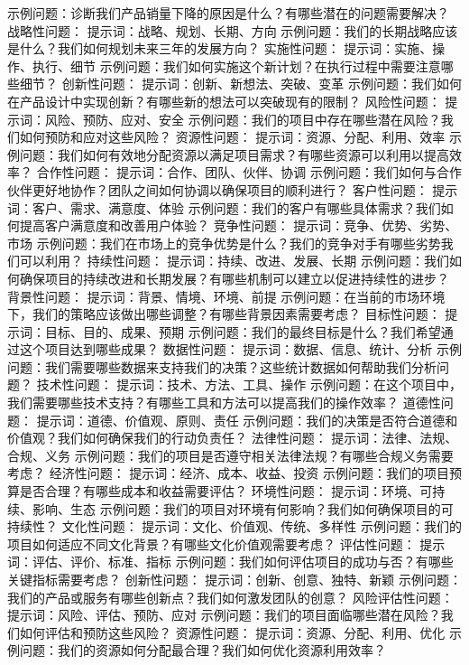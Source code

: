 \documentclass[12pt]{book}
\begin{document}
示例问题：诊断我们产品销量下降的原因是什么？有哪些潜在的问题需要解决？
战略性问题：
提示词：战略、规划、长期、方向
示例问题：我们的长期战略应该是什么？我们如何规划未来三年的发展方向？
实施性问题：
提示词：实施、操作、执行、细节
示例问题：我们如何实施这个新计划？在执行过程中需要注意哪些细节？
创新性问题：
提示词：创新、新想法、突破、变革
示例问题：我们如何在产品设计中实现创新？有哪些新的想法可以突破现有的限制？
风险性问题：
提示词：风险、预防、应对、安全
示例问题：我们的项目中存在哪些潜在风险？我们如何预防和应对这些风险？
资源性问题：
提示词：资源、分配、利用、效率
示例问题：我们如何有效地分配资源以满足项目需求？有哪些资源可以利用以提高效率？
合作性问题：
提示词：合作、团队、伙伴、协调
示例问题：我们如何与合作伙伴更好地协作？团队之间如何协调以确保项目的顺利进行？
客户性问题：
提示词：客户、需求、满意度、体验
示例问题：我们的客户有哪些具体需求？我们如何提高客户满意度和改善用户体验？
竞争性问题：
提示词：竞争、优势、劣势、市场
示例问题：我们在市场上的竞争优势是什么？我们的竞争对手有哪些劣势我们可以利用？
持续性问题：
提示词：持续、改进、发展、长期
示例问题：我们如何确保项目的持续改进和长期发展？有哪些机制可以建立以促进持续性的进步？
背景性问题：
提示词：背景、情境、环境、前提
示例问题：在当前的市场环境下，我们的策略应该做出哪些调整？有哪些背景因素需要考虑？
目标性问题：
提示词：目标、目的、成果、预期
示例问题：我们的最终目标是什么？我们希望通过这个项目达到哪些成果？
数据性问题：
提示词：数据、信息、统计、分析
示例问题：我们需要哪些数据来支持我们的决策？这些统计数据如何帮助我们分析问题？
技术性问题：
提示词：技术、方法、工具、操作
示例问题：在这个项目中，我们需要哪些技术支持？有哪些工具和方法可以提高我们的操作效率？
道德性问题：
提示词：道德、价值观、原则、责任
示例问题：我们的决策是否符合道德和价值观？我们如何确保我们的行动负责任？
法律性问题：
提示词：法律、法规、合规、义务
示例问题：我们的项目是否遵守相关法律法规？有哪些合规义务需要考虑？
经济性问题：
提示词：经济、成本、收益、投资
示例问题：我们的项目预算是否合理？有哪些成本和收益需要评估？
环境性问题：
提示词：环境、可持续、影响、生态
示例问题：我们的项目对环境有何影响？我们如何确保项目的可持续性？
文化性问题：
提示词：文化、价值观、传统、多样性
示例问题：我们的项目如何适应不同文化背景？有哪些文化价值观需要考虑？
评估性问题：
提示词：评估、评价、标准、指标
示例问题：我们如何评估项目的成功与否？有哪些关键指标需要考虑？
创新性问题：
提示词：创新、创意、独特、新颖
示例问题：我们的产品或服务有哪些创新点？我们如何激发团队的创意？
风险评估性问题：
提示词：风险、评估、预防、应对
示例问题：我们的项目面临哪些潜在风险？我们如何评估和预防这些风险？
资源性问题：
提示词：资源、分配、利用、优化
示例问题：我们的资源如何分配最合理？我们如何优化资源利用效率？
\end{document}
